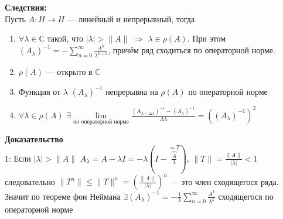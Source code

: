 \documentclass[12pt]{article}
\begin{document}
\textbf{Следствия:}\\
Пусть $A : H \to H$ --- линейный и непрерывный, тогда
\begin{enumerate}
    \item{$\forall \lambda \in \mathbb C$ такой, что $|\lambda| > \|A\|$ $\Rightarrow$ $\lambda \in \rho(A)$.
        При этом $(A_\lambda)^{-1} = -\sum \limits_{n = 0}^{\infty}\frac{A^k}{\lambda^{k+1}}$, причём ряд сходиться по операторной норме.}
    \item{$\rho(A)$ --- открыто в $\mathbb C$}
    \item{Функция от $\lambda$ $(A_\lambda)^{-1}$ непрерывна на $\rho(A)$ по операторной норме}
    \item{$\forall \lambda \in \rho(A)$ $\exists \lim\limits_{\text{по операторной норме}}\frac{(A_{\lambda + \Delta \lambda})^{-1} - (A_\lambda)^{-1}}{\Delta\lambda} =
        ((A_\lambda)^{-1})^2$}
\end{enumerate}

\textbf{Доказательство}\\
1: Если $|\lambda| > \|A\|$ $A_\lambda = A - \lambda I = -\lambda (I - \overbrace{\frac{A}{\lambda}}^{=T})$, $\|T\|=\frac{\|A\|}{|\lambda|} < 1$
следовательно $\|T^n\| \le \|T\|^n = \left( \frac{\|A\|}{|\lambda|}\right)^n$ --- это член сходящегося ряда.
Значит по теореме фон Неймана $\exists (A_\lambda)^{-1} = -\frac{1}{\lambda}\sum\limits_{n = 0}^{\infty}\frac{A^k}{\lambda^k}$ сходящегося по операторной норме
\end{document}

